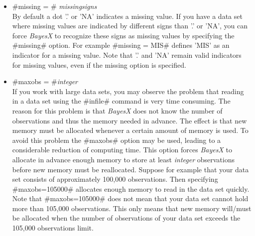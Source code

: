 
\begin{itemize}
\item #missing = # {\em missingsigns} \\
By default a dot '.' or 'NA' indicates a missing value. If you
have a data set where missing values are indicated by different
signs than '.' or 'NA', you can force {\em BayesX} to recognize
these signs as missing values by specifying the #missing# option.
For example #missing = MIS# defines 'MIS' as an indicator for a
missing value. Note that
 '.' and 'NA' remain valid indicators for missing values, even if the missing
option is specified.

\item #maxobs = #{\em integer} \\
If you work with large data sets, you may observe the problem that
reading in a data set using the #infile# command is very time
consuming. The reason for this problem is that {\em BayesX} does
not know the number of observations and thus the memory needed in
advance. The effect is that new memory must be allocated whenever
a certain amount of memory is used. To avoid this problem the
#maxobs# option may be used, leading to a considerable reduction
of computing time. This option forces {\em BayesX} to allocate in
advance enough memory  to store at least {\em integer}
observations before new memory must be reallocated. Suppose for
example that your data set consists of approximately 100,000
observations. Then specifying #maxobs=105000# allocates enough
memory to read in the data set quickly. Note that #maxobs=105000#
does not mean that your data set cannot hold more than 105,000
observations. This only means that new memory will/must be
allocated when the number of observations of your data set exceeds
the 105,000 observations limit.
\end{itemize}



